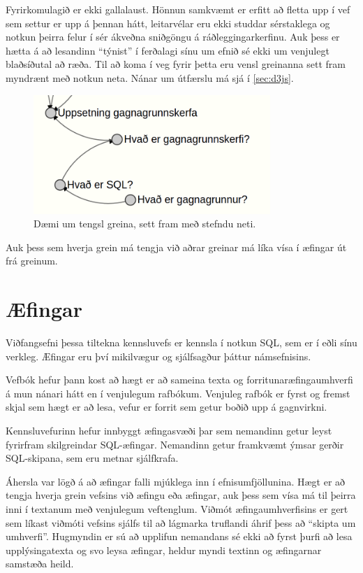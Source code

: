 \documentclass[a4paper,12pt,twoside,BCOR=10mm]{scrbook}
\begin{document}
Fyrirkomulagið er ekki gallalaust. Hönnun samkvæmt er erfitt að fletta upp í vef sem settur er upp á þennan hátt, leitarvélar eru ekki studdar sérstaklega og notkun þeirra felur í sér ákveðna sniðgöngu á ráðleggingarkerfinu. Auk þess er hætta á að lesandinn ``týnist'' í ferðalagi sínu um efnið sé ekki um venjulegt blaðsíðutal að ræða. Til að koma í veg fyrir þetta eru vensl greinanna sett fram myndrænt með notkun neta. Nánar um útfærslu má sjá í \ref{sec:d3js}.
\begin{figure}
\caption{Dæmi um tengsl greina, sett fram með stefndu neti.}
\begin{center}
\includegraphics[width=0.8\textwidth]{relational-sections}
\end{center}
\end{figure}

Auk þess sem hverja grein má tengja við aðrar greinar má líka vísa í æfingar út frá greinum.
\section{Æfingar}
\label{sec:exercise-explanation}
Viðfangsefni þessa tiltekna kennsluvefs er kennsla í notkun SQL, sem er í eðli sínu verkleg. Æfingar eru því mikilvægur og sjálfsagður þáttur námsefnisins.

Vefbók hefur þann kost að hægt er að sameina texta og forritunaræfingaumhverfi á mun nánari hátt en í venjulegum rafbókum. Venjuleg rafbók er fyrst og fremst skjal sem hægt er að lesa, vefur er forrit sem getur boðið upp á gagnvirkni.

Kennsluvefurinn hefur innbyggt æfingasvæði þar sem nemandinn getur leyst fyrirfram skilgreindar SQL-æfingar. Nemandinn getur framkvæmt ýmsar gerðir SQL-skipana, sem eru metnar sjálfkrafa.

Áhersla var lögð á að æfingar falli mjúklega inn í efnisumfjöllunina. Hægt er að tengja hverja grein vefsins við æfingu eða æfingar, auk þess sem vísa má til þeirra inni í textanum með venjulegum veftenglum. Viðmót æfingaumhverfisins er gert sem líkast viðmóti vefsins sjálfs til að lágmarka truflandi áhrif þess að ``skipta um umhverfi''. Hugmyndin er sú að upplifun nemandans sé ekki að fyrst þurfi að lesa upplýsingatexta og svo leysa æfingar, heldur myndi textinn og æfingarnar samstæða heild.
\end{document}
